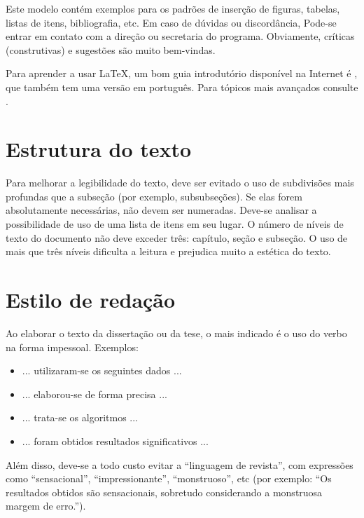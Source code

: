 Este modelo contém exemplos para os padrões de inserção de figuras, tabelas, listas de itens, bibliografia, etc. Em caso de dúvidas ou discordância, Pode-se entrar em contato com a direção ou secretaria do programa. Obviamente, críticas (construtivas) e sugestões são muito bem-vindas.

Para aprender a usar \LaTeX, um bom guia introdutório disponível na Internet é \cite{oetiker07}, que também tem uma versão em português. Para tópicos mais avançados consulte \cite{goossens93}.


\section{Estrutura do texto}

Para melhorar a legibilidade do texto, deve ser evitado o uso de subdivisões mais profundas que a subseção (por exemplo, subsubseções). Se elas forem absolutamente necessárias, não devem ser numeradas. Deve-se analisar a possibilidade de uso de uma lista de itens em seu lugar. O número de níveis de texto do documento não deve exceder três: capítulo, seção e subseção. O uso de mais que três níveis dificulta a leitura e prejudica muito a estética do texto.


\section{Estilo de redação}

Ao elaborar o texto da dissertação ou da tese, o mais indicado é o uso do verbo na forma impessoal. Exemplos:

\begin{itemize}
\item ... utilizaram-se os seguintes dados ...
\item ... elaborou-se de forma precisa ...
\item ... trata-se os algoritmos ...
\item ... foram obtidos resultados significativos ...
\end{itemize}

Além disso, deve-se a todo custo evitar a ``linguagem de revista'', com expressões como ``sensacional'', ``impressionante'', ``monstruoso'', etc (por exemplo: ``Os resultados obtidos são sensacionais, sobretudo considerando a monstruosa margem de erro.'').

